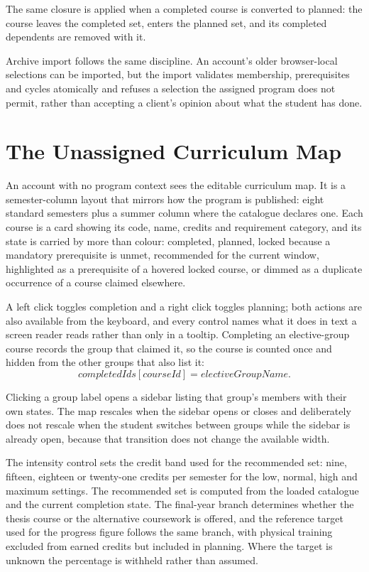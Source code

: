 The same closure is applied when a completed course is converted to planned: the course leaves the
completed set, enters the planned set, and its completed dependents are removed with it.

Archive import follows the same discipline. An account's older browser-local selections can be
imported, but the import validates membership, prerequisites and cycles atomically and refuses a
selection the assigned program does not permit, rather than accepting a client's opinion about what
the student has done.

\section{The Unassigned Curriculum Map}

An account with no program context sees the editable curriculum map. It is a semester-column layout
that mirrors how the program is published: eight standard semesters plus a summer column where the
catalogue declares one. Each course is a card showing its code, name, credits and requirement
category, and its state is carried by more than colour: completed, planned, locked because a
mandatory prerequisite is unmet, recommended for the current window, highlighted as a prerequisite
of a hovered locked course, or dimmed as a duplicate occurrence of a course claimed elsewhere.

A left click toggles completion and a right click toggles planning; both actions are also available
from the keyboard, and every control names what it does in text a screen reader reads rather than
only in a tooltip. Completing an elective-group course records the group that claimed it, so the
course is counted once and hidden from the other groups that also list it:
\[
  \mathit{completedIds}[\mathit{courseId}] = \mathit{electiveGroupName}.
\]

Clicking a group label opens a sidebar listing that group's members with their own states. The map
rescales when the sidebar opens or closes and deliberately does not rescale when the student
switches between groups while the sidebar is already open, because that transition does not change
the available width.

The intensity control sets the credit band used for the recommended set: nine, fifteen, eighteen or
twenty-one credits per semester for the low, normal, high and maximum settings. The recommended set
is computed from the loaded catalogue and the current completion state. The final-year branch
determines whether the thesis course or the alternative coursework is offered, and the reference
target used for the progress figure follows the same branch, with physical training excluded from
earned credits but included in planning. Where the target is unknown the percentage is withheld
rather than assumed.

